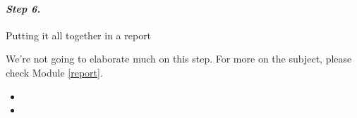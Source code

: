 



\paragraph{\emph{Step 6.}} Putting it all together in a report

We're not going to elaborate much on this step. For more on the subject, please check Module \ref{report}.





\begin{video}
\begin{itemize}
	\item {}
	\item {}
\end{itemize}	
\end{video}

